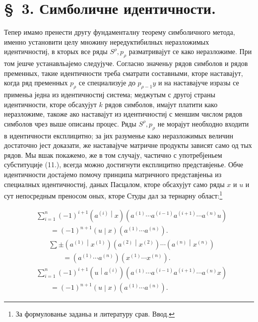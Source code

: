 ﻿\documentclass[11pt]{article}
\newcommand{\pair}[2]{\left(#1\middle|#2\right)}
\begin{document}
\section*{\S\ 3. Симболичне идентичности.}

Тепер имамо пренести другу фундаменталну теорему симболичного метода, именно установити целу множину нередуктибилных неразложимых идентичностиј, в кторых все ряды $S^\rho,p_\rho$ разматривајут се како неразложиме. При том јешче устанавльајемо следујуче. Согласно значеньу рядов симболов и рядов пременных, такие идентичности треба сматрати составными, кторе наставајут, когда ряд пременных $p_\rho$ се специализује до $p_{\rho-1}y$ и на наставајуче изразы се применьа једна из идентичностиј система; меджутым с другој страны идентичности, кторе обсахујут $k$ рядов симболов, имајут платити како неразложиме, такоже ако наставајут из идентичностиј с меншим числом рядов симболов чрез выше описаны процес. Ряды $S^\rho,p_\rho$ не морајут необходно входити в идентичности експлицитно; за јих разуменье како неразложимых величин достаточно јест доказати, же наставајуче матричне продукты зависят само од тых рядов. Мы вшак покажемо, же в том случају, частично с употребјеньем субституције (11.), всегда можно достигнути експлицитно представјенье. Обче идентичности достајемо помочу принципа матричного представјеньа из специалных идентичностиј, даных Пасцалом, кторе обсахујут само ряды $x$ и $u$ и сут непосредным преносом оных, кторе Студы дал за тернарну област:\footnote{За формулованье заданьа и литературу срав. Ввод.}

\begin{equation}
\begin{aligned}
&\sum_{i=1}^n(-1)^{i+1}\pair{a^{(i)}}{x}
(a^{(1)}\cdots a^{(i-1)}a^{(i+1)}\cdots a^{(n)}u)\\
&\qquad =(-1)^{n+1}\pair{u}{x}(a^{(1)}\cdots a^{(n)}).
\end{aligned}
\tag{13}
\end{equation}
\begin{equation}
\begin{aligned}
&\sum\pm\pair{a^{(1)}}{x^{(1)}}\pair{a^{(2)}}{x^{(2)}}\cdots
\pair{a^{(n)}}{x^{(n)}}\\
&\qquad=(a^{(1)}\cdots a^{(n)})(x^{(1)}\cdots x^{(n)}).
\end{aligned}
\tag{14}
\end{equation}
\begin{equation}
\begin{aligned}
&\sum_{i=1}^n(-1)^{i+1}\pair{u}{a^{(i)}}
(a^{(1)}\cdots a^{(i-1)}a^{(i+1)}\cdots a^{(n)}x)\\
&\qquad =(-1)^{n+1}\pair{u}{x}(a^{(1)}\cdots a^{(n)}).
\end{aligned}
\tag{15}
\end{equation}
\end{document}
